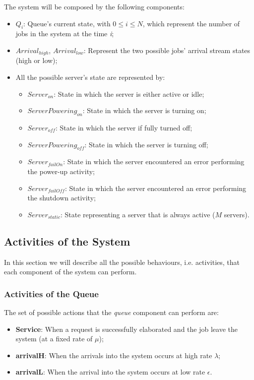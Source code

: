 \documentclass{article}
\begin{document}
\par\noindent The system will be composed by the following components: 

\begin{itemize}
    \item \(Q_{i}\): Queue's current state, with \(0\leq i \leq N\), which represent the number of jobs in the system at the time \textit{i};
    \item \(Arrival_{high}\), \(Arrival_{low}\): Represent the two possible jobs' arrival stream states (high or low);
    \item All the possible server's state are represented by:
    \begin{itemize}
        \item \(Server_{on}\): State in which the server is either active or idle;
        \item \(ServerPowering_{on}\): State in which the server is turning on;
        \item \(Server_{off}\): State in which the server if fully turned off;
        \item \(ServerPowering_{off}\): State in which the server is turning off;
        \item \(Server_{failOn}\): State in which the server encountered an error performing the power-up activity;
        \item \(Server_{failOff}\): State in which the server encountered an error performing the shutdown activity;
        \item \(Server_{static}\): State representing a server that is always active (\(M\) servers).
    \end{itemize}
\end{itemize}

\subsection{Activities of the System}
In this section we will describe all the possible behaviours, i.e. activities, that each component of the system can perform.

\subsubsection{Activities of the Queue}
The set of possible actions that the \textit{queue} component can perform are:

\begin{itemize}
    \item \textbf{Service}: When a request is successfully elaborated and the job leave the system (at a fixed rate of \(\mu\));
    \item \textbf{arrivalH}: When the arrivals into the system occurs at high rate \(\lambda\);
    \item \textbf{arrivalL}: When the arrival into the system occurs at low rate \(\epsilon\).
\end{itemize}
\end{document}
